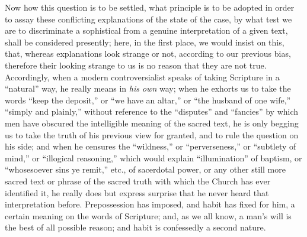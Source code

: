 Now how this question is to be settled, what
principle is to be adopted in order to assay these conflicting
explanations of the state of the case, by what test we are to
discriminate a sophistical from a genuine interpretation of a given
text, shall be considered presently; here, in the first place, we
would insist on this, that, whereas explanations look strange or not,
according to our previous bias, therefore their looking strange
to us is no reason that they are not true. Accordingly, when a modern
controversialist speaks of taking Scripture in a ``natural'' way, he
really means in \emph{his own} way; when he exhorts us to take the
words ``keep the deposit,'' or ``we have an altar,'' or ``the husband of
one wife,'' ``simply and plainly,'' without reference to the ``disputes''
and ``fancies'' by which men have obscured the intelligible meaning of
the sacred text, he is only begging us to take the truth of his
previous view for granted, and to rule the question on his side; and
when he censures the ``wildness,'' or ``perverseness,'' or ``subtlety of
mind,'' or ``illogical reasoning,'' which would explain ``illumination'' of
baptism, or ``whosesoever sins ye remit,'' etc., of sacerdotal power, or
any other still more sacred text or phrase of the sacred truth with
which the Church has ever identified it, he really does but express
surprise that he never heard that interpretation before. Prepossession
has imposed, and habit has fixed for him, a certain meaning on the
words of Scripture; and, as we all know, a man's will is the best of
all possible reason; and habit is confessedly a second nature.

